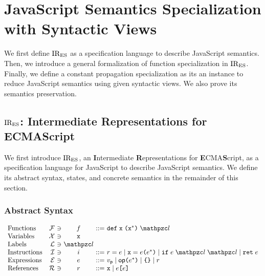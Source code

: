 \section{JavaScript Semantics Specialization with Syntactic Views}\label{sec:formal}

We first define $\text{IR}_\text{ES}$ as a specification language to describe JavaScript
semantics.  Then, we introduce a general formalization of function
specialization in $\text{IR}_\text{ES}$. Finally, we define a constant propagation
specialization as its an instance to reduce JavaScript semantics using given
syntactic views. We also prove its semantics preservation.

\subsection{$\text{IR}_\text{ES}$: Intermediate Representations for ECMAScript}

We first introduce $\text{IR}_\text{ES}$, an \textbf{I}ntermediate \textbf{R}epresentations
for \textbf{E}CMA\textbf{S}cript, as a specification language for JavaScript to
describe JavaScript semantics. We define its abstract syntax, states, and
concrete semantics in the remainder of this section.

\subsubsection{Abstract Syntax}

\[
  \begin{array}{lr@{~}c@{~}c@{~}c@{~}l}
    \text{Functions} & \funcset &\ni& \func &::=&
    \kwdef \; \varx \; \kwrl \varx^* \kwrr \; \lab\\

    \text{Variables} & \varset &\ni& \varx\\

    \text{Labels} & \labset &\ni& \lab\\

    \text{Instructions} & \instset &\ni& \inst &::=&
    \refer = \expr \mid
    \varx = \expr \kwrl \expr^* \kwrr \mid
    \kwif \; \expr \; \lab \; \lab \mid
    \kwret \; \expr\\

    \text{Expressions} & \exprset &\ni& \expr &::=&
    \pval \mid
    \op \kwrl \expr^* \kwrr \mid
    \kwcl \kwcr \mid
    \refer\\

    \text{References} & \referset &\ni& \refer &::=&
    \varx \mid \expr \kwsl \expr \kwsr\\
  \end{array}
\]

